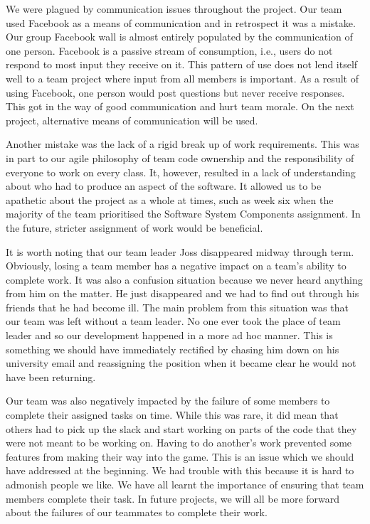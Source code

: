 We were plagued by communication issues throughout the project. Our
team used Facebook as a means of communication and in retrospect it
was a mistake. Our group Facebook wall is almost entirely populated by
the communication of one person. Facebook is a passive stream of
consumption, i.e., users do not respond to most input they receive on
it. This pattern of use does not lend itself well to a team project
where input from all members is important. As a result of using
Facebook, one person would post questions but never receive
responses. This got in the way of good communication and hurt team
morale. On the next project, alternative means of communication will
be used.

Another mistake was the lack of a rigid break up of work requirements.
This was in part to our agile philosophy of team code ownership and
the responsibility of everyone to work on every class. It, however,
resulted in a lack of understanding about who had to produce an aspect
of the software. It allowed us to be apathetic about the project as a
whole at times, such as week six when the majority of the team
prioritised the Software System Components assignment. In the future,
stricter assignment of work would be beneficial.

It is worth noting that our team leader Joss disappeared midway
through term. Obviously, losing a team member has a negative impact on
a team's ability to complete work. It was also a confusion situation
because we never heard anything from him on the matter. He just
disappeared and we had to find out through his friends that he had
become ill. The main problem from this situation was that our team was
left without a team leader. No one ever took the place of team leader
and so our development happened in a more ad hoc manner. This is
something we should have immediately rectified by chasing him down on
his university email and reassigning the position when it became clear
he would not have been returning.

Our team was also negatively impacted by the failure of some members
to complete their assigned tasks on time. While this was rare, it did
mean that others had to pick up the slack and start working on parts
of the code that they were not meant to be working on. Having to do
another's work prevented some features from making their way into the
game. This is an issue which we should have addressed at the
beginning. We had trouble with this because it is hard to admonish
people we like. We have all learnt the importance of ensuring that
team members complete their task. In future projects, we will all be
more forward about the failures of our teammates to complete their
work.

